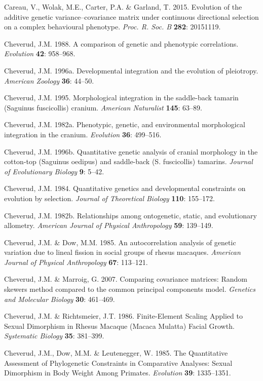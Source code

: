 \documentclass[12pt,twoside]{report}
\begin{document}
Careau, V., Wolak, M.E., Carter, P.A. \& Garland, T. 2015. Evolution of
the additive genetic variance--covariance matrix under continuous
directional selection on a complex behavioural phenotype. \emph{Proc. R.
Soc. B} \textbf{282}: 20151119.

Cheverud, J.M. 1988. A comparison of genetic and phenotypic
correlations. \emph{Evolution} \textbf{42}: 958--968.

Cheverud, J.M. 1996a. Developmental integration and the evolution of
pleiotropy. \emph{American Zoology} \textbf{36}: 44--50.

Cheverud, J.M. 1995. Morphological integration in the saddle-back
tamarin (Saguinus fuscicollis) cranium. \emph{American Naturalist}
\textbf{145}: 63--89.

Cheverud, J.M. 1982a. Phenotypic, genetic, and environmental
morphological integration in the cranium. \emph{Evolution} \textbf{36}:
499--516.

Cheverud, J.M. 1996b. Quantitative genetic analysis of cranial
morphology in the cotton-top (Saguinus oedipus) and saddle-back (S.
fuscicollis) tamarins. \emph{Journal of Evolutionary Biology}
\textbf{9}: 5--42.

Cheverud, J.M. 1984. Quantitative genetics and developmental constraints
on evolution by selection. \emph{Journal of Theoretical Biology}
\textbf{110}: 155--172.

Cheverud, J.M. 1982b. Relationships among ontogenetic, static, and
evolutionary allometry. \emph{American Journal of Physical Anthropology}
\textbf{59}: 139--149.

Cheverud, J.M. \& Dow, M.M. 1985. An autocorrelation analysis of genetic
variation due to lineal fission in social groups of rhesus macaques.
\emph{American Journal of Physical Anthropology} \textbf{67}: 113--121.

Cheverud, J.M. \& Marroig, G. 2007. Comparing covariance matrices:
Random skewers method compared to the common principal components model.
\emph{Genetics and Molecular Biology} \textbf{30}: 461--469.

Cheverud, J.M. \& Richtsmeier, J.T. 1986. Finite-Element Scaling Applied
to Sexual Dimorphism in Rhesus Macaque (Macaca Mulatta) Facial Growth.
\emph{Systematic Biology} \textbf{35}: 381--399.

Cheverud, J.M., Dow, M.M. \& Leutenegger, W. 1985. The Quantitative
Assessment of Phylogenetic Constraints in Comparative Analyses: Sexual
Dimorphism in Body Weight Among Primates. \emph{Evolution} \textbf{39}:
1335--1351.
\end{document}
